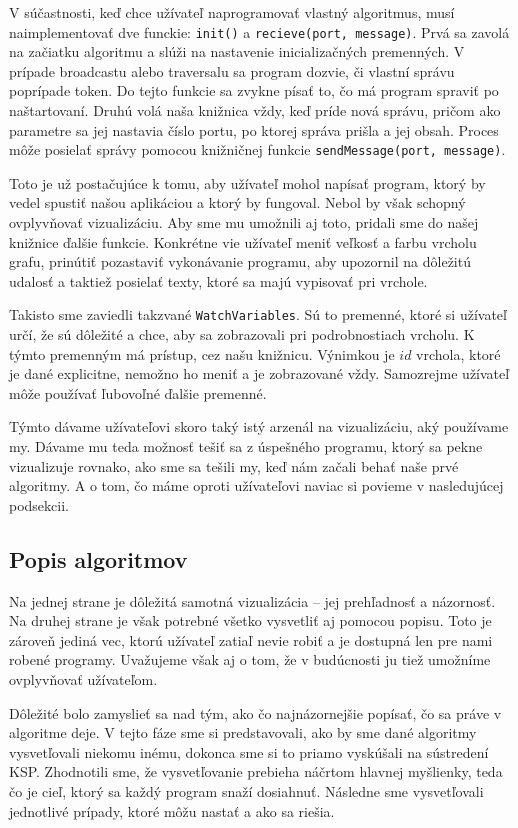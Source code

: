 V súčastnosti, keď chce užívateľ naprogramovať vlastný algoritmus, musí naimplementovať dve funckie: \verb!init()! a
\verb!recieve(port, message)!. Prvá sa zavolá na začiatku algoritmu a slúži na nastavenie
inicializačných premenných. V prípade broadcastu alebo traversalu sa program dozvie, či vlastní správu poprípade token.
Do tejto funkcie sa zvykne písať to, čo má program spraviť po naštartovaní.
Druhú volá naša knižnica vždy, keď príde nová správu, pričom ako parametre sa jej nastavia číslo
portu, po ktorej správa prišla a jej obsah. Proces môže posielať správy pomocou knižničnej
funkcie \verb!sendMessage(port, message)!.

Toto je už postačujúce k tomu, aby užívateľ mohol napísať program, ktorý by vedel spustiť našou
aplikáciou a ktorý by fungoval. Nebol by však schopný ovplyvňovať vizualizáciu. Aby sme mu umožnili
aj toto, pridali sme do našej knižnice ďalšie funkcie. Konkrétne vie užívateľ meniť veľkosť a farbu
vrcholu grafu, prinútiť pozastaviť vykonávanie programu, aby upozornil na dôležitú udalosť a
taktiež posielať texty, ktoré sa majú vypisovať pri vrchole.

Takisto sme zaviedli takzvané \verb!WatchVariables!. Sú to premenné, ktoré si užívateľ určí, že sú
dôležité a chce, aby sa zobrazovali pri podrobnostiach vrcholu. K týmto premenným má
prístup, cez našu knižnicu. Výnimkou je $id$ vrchola, ktoré je dané explicitne, nemožno ho
meniť a je zobrazované vždy. Samozrejme užívateľ môže používať ľubovoľné ďalšie premenné.

Týmto dávame užívateľovi skoro taký istý arzenál na vizualizáciu, aký používame my. Dávame mu teda
možnosť tešiť sa z úspešného programu, ktorý sa pekne vizualizuje rovnako, ako sme sa tešili my, keď
nám začali behať naše prvé algoritmy. A o tom, čo máme oproti užívateľovi naviac si povieme v
nasledujúcej podsekcii.

\subsection{Popis algoritmov}

Na jednej strane je dôležitá samotná vizualizácia -- jej prehľadnosť a názornosť. Na druhej strane
je však potrebné všetko vysvetliť aj pomocou popisu. Toto je zároveň jediná vec, ktorú užívateľ
zatiaľ nevie robiť a je dostupná len pre nami robené programy. Uvažujeme však aj o tom, že v budúcnosti
ju tiež umožníme ovplyvňovať užívateľom.

Dôležité bolo zamyslieť sa nad tým, ako čo najnázornejšie popísať, čo sa práve v algoritme deje.
V tejto fáze sme si predstavovali, ako by sme dané algoritmy vysvetľovali niekomu inému, dokonca sme si to priamo
vyskúšali na sústredení KSP. Zhodnotili sme, že vysvetľovanie prebieha náčrtom hlavnej myšlienky,
teda čo je cieľ, ktorý sa každý program snaží dosiahnuť. Následne sme vysvetľovali jednotlivé prípady, ktoré
môžu nastať a ako sa riešia.

